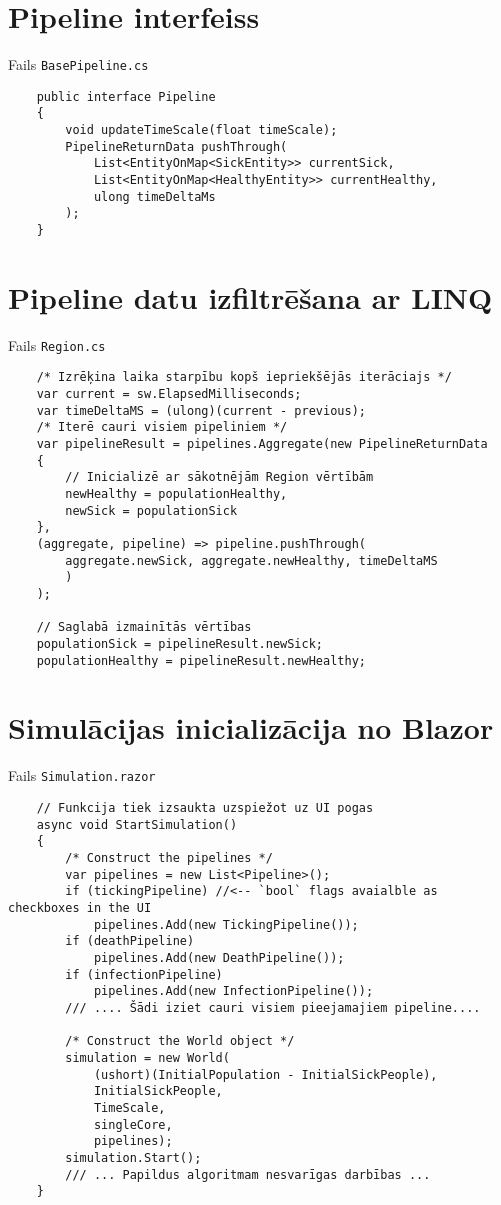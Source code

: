 \section{Pipeline interfeiss}
\label{app:IPipeline}

Fails \texttt{BasePipeline.cs}
{
\begin{verbatim}
    public interface Pipeline
    {
        void updateTimeScale(float timeScale);
        PipelineReturnData pushThrough(
            List<EntityOnMap<SickEntity>> currentSick,
            List<EntityOnMap<HealthyEntity>> currentHealthy,
            ulong timeDeltaMs
        );
    }
\end{verbatim}
}

\section{Pipeline datu izfiltrēšana ar LINQ}
\label{app:pipelien-linq}
Fails \texttt{Region.cs}
{
\begin{verbatim}
    /* Izrēķina laika starpību kopš iepriekšējās iterāciajs */
    var current = sw.ElapsedMilliseconds;
    var timeDeltaMS = (ulong)(current - previous);
    /* Iterē cauri visiem pipeliniem */
    var pipelineResult = pipelines.Aggregate(new PipelineReturnData
    {
        // Inicializē ar sākotnējām Region vērtībām
        newHealthy = populationHealthy,
        newSick = populationSick
    },
    (aggregate, pipeline) => pipeline.pushThrough(
        aggregate.newSick, aggregate.newHealthy, timeDeltaMS
        )
    );

    // Saglabā izmainītās vērtības
    populationSick = pipelineResult.newSick;
    populationHealthy = pipelineResult.newHealthy;
\end{verbatim}
}

\section{Simulācijas inicializācija no Blazor}
\label{app:init-simulation}
Fails \texttt{Simulation.razor}
{
\begin{verbatim}
    // Funkcija tiek izsaukta uzspiežot uz UI pogas
    async void StartSimulation()
    {
        /* Construct the pipelines */
        var pipelines = new List<Pipeline>();
        if (tickingPipeline) //<-- `bool` flags avaialble as checkboxes in the UI
            pipelines.Add(new TickingPipeline());
        if (deathPipeline)
            pipelines.Add(new DeathPipeline());
        if (infectionPipeline)
            pipelines.Add(new InfectionPipeline());
        /// .... Šādi iziet cauri visiem pieejamajiem pipeline....

        /* Construct the World object */
        simulation = new World(
            (ushort)(InitialPopulation - InitialSickPeople),
            InitialSickPeople,
            TimeScale,
            singleCore,
            pipelines);
        simulation.Start();
        /// ... Papildus algoritmam nesvarīgas darbības ...
    }
\end{verbatim}
}


